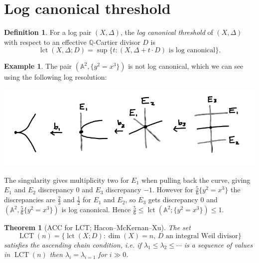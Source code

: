 \documentclass{article}
\newtheorem*{theorem}{Theorem}
\theoremstyle{definition}
\newtheorem*{definition}{Definition}
\newtheorem*{example}{Example}
\DeclareMathOperator{\lct}{lct}
\DeclareMathOperator{\LCT}{LCT}
\newcommand{\A}{\mathbb{A}}
\newcommand{\Q}{\mathbb{Q}}
\begin{document}
\section*{Log canonical threshold}

\begin{definition}
    For a log pair $(X,\Delta)$, the \emph{log canonical threshold} of $(X,\Delta)$
    with respect to an effective $\Q$-Cartier divisor $D$ is
    \begin{equation*}
        \lct(X,\Delta;D) = \sup\{t:\text{$(X,\Delta+t\cdot D)$ is log canonical}\}.
    \end{equation*}
\end{definition}

\begin{example}
    The pair $(\A^2,\{y^2=x^3\})$ is not log canonical, which we can see using
    the following log resolution:
    \begin{center}
        \includegraphics[scale=0.6]{log_resolution}
    \end{center}
    The singularity gives multiplicity two for $E_1$ when pulling back the
    curve, giving $E_1$ and $E_2$ discrepancy 0 and $E_3$ discrepancy $-1$.
    However for $\frac{5}{6}\{y^2=x^3\}$ the discrepancies are $\frac{2}{3}$ and
    $\frac{1}{2}$ for $E_1$ and $E_2$, so $E_3$ gets discrepancy 0 and
    $(\A^2,\frac{5}{6}\{y^2=x^3\})$ is log canonical. Hence
    $\frac{5}{6}\le\lct(\A^2;\{y^2=x^3\})\le1$.
\end{example}

\begin{theorem}[ACC for LCT; Hacon--McKernan--Xu]
    The set
    \begin{equation*}
        \LCT(n) = \{\lct(X;D)
            :\text{$\dim(X)=n$, $D$ an integral Weil divisor}\}
    \end{equation*}
    satisfies the ascending chain condition, i.e. if
    $\lambda_1\le\lambda_2\le\cdots$ is a sequence of values in $\LCT(n)$ then
    $\lambda_i=\lambda_{i=1}$ for $i\gg0$.
\end{theorem}
\end{document}
